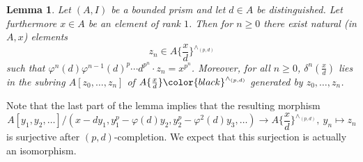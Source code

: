 \documentclass{amsart}
\theoremstyle{plain}
\newtheorem{lemma}[theorem]{Lemma}
\theoremstyle{definition}
\newcommand{\red}[1]{{\color{black} #1}}
\newcommand{\green}[1]{{\color{black}#1}}
\newcommand{\blue}[1]{{\color{black}#1}}
\begin{document}
\begin{lemma}
  \label{sec:concr-pres-prism-proposition-presentation-of-prismatic-envelope-for-rank-one-element}
  Let $(A,I)$ be a \red{bounded} prism and let $d\in A$ be distinguished.  Let
  furthermore $x\in A$ be an element of rank $1$. Then for \green{$n\geq 0$} there exist natural (in $A,x$) elements
  $$
  z_n\in  A\{\frac{x}{d}\}^{\wedge_{(p,d)}}
  $$
  such that $\varphi^{n}(d)\varphi^{n-1}(d)^p\cdots
    d^{p^n}\cdot z_n=x^{p^n}$. \blue{Moreover, for all $n\geq 0$, $\delta^n(\frac{x}{d})$ lies in the subring $A[z_0,\ldots, z_{n}]$ of $A\{\frac{x}{d}\}\red{^{\wedge_{(p,d)}}}$ generated by $z_0,\ldots,z_{n}$.}
\end{lemma}
\blue{Note that the last part of the lemma implies that the resulting morphism
  $$
  A[y_1,y_2,\ldots]/(x-d y_1,
  y_1^p-\varphi(d)y_2,y_2^p-\varphi^2(d)y_3,\ldots)\to
  A\{\frac{x}{d}\}^{\wedge_{(p,d)}},\ y_n\mapsto z_n
  $$
  is surjective after $(p,d)$-completion.} \green{We expect that this surjection is actually an isomorphism.}
\end{document}
